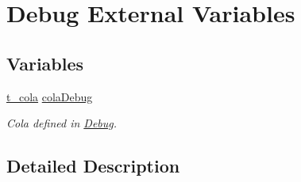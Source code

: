 \hypertarget{group___debug___external___variables}{}\section{Debug External Variables}
\label{group___debug___external___variables}
\subsection*{Variables}
\begin{DoxyCompactItemize}
\item 
\hyperlink{structt__cola}{t\+\_\+cola} \hyperlink{group___debug___external___variables_ga314fd637d927bd6a2551e119de623aa5}{cola\+Debug}\hypertarget{group___debug___external___variables_ga314fd637d927bd6a2551e119de623aa5}{}\label{group___debug___external___variables_ga314fd637d927bd6a2551e119de623aa5}

\begin{DoxyCompactList}\small\item\em Cola defined in \hyperlink{group___debug}{Debug}. \end{DoxyCompactList}\end{DoxyCompactItemize}


\subsection{Detailed Description}
